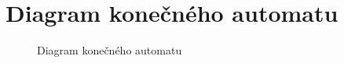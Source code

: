 \documentclass[a4paper, 11pt]{article}
\begin{document}
\section{Diagram konečného automatu}
\begin{figure}[ht]
  \centering
\caption{Diagram konečného automatu}\label{pic:1}
\end{figure}
\newpage

\end{document}
